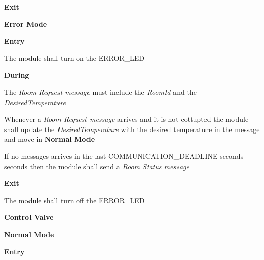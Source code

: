 \begin{req_enum}
\begin{req_enum}[label*=\arabic*.]
\begin{req_enum}[label*=\arabic*.]
							\item \textbf{Exit}
						\end{req_enum}

					\item \textbf{Error Mode}
						\begin{req_enum}[label*=\arabic*.]
							\item \textbf{Entry}
								\begin{req_enum}[label*=\arabic*.]
									\item The module shall turn on the ERROR\_LED
								\end{req_enum}

							\item \textbf{During}
							\begin{req_enum}[label*=\arabic*.]
								\item The \textit{Room Request message} must include the \textit{RoomId} and the \textit{DesiredTemperature}
								\item Whenever a \textit{Room Request message} arrives and it is not cottupted the module shall update the \textit{DesiredTemperature} with the desired temperature in the message and move in \textbf{Normal Mode}
								\item If no messages arrives in the last COMMUNICATION\_DEADLINE seconds  seconds then the module shall send a \textit{Room Status message}
							\end{req_enum}

							\item \textbf{Exit}
								\begin{req_enum}[label*=\arabic*.]
									\item The module shall turn off the ERROR\_LED
								\end{req_enum}
						\end{req_enum}
				\end{req_enum}
			\item \textbf{Control Valve}
				\begin{req_enum}[label*=\arabic*.]
					\item \textbf{Normal Mode}
						\begin{req_enum}[label*=\arabic*.]
							\item \textbf{Entry}


\end{req_enum}
\end{req_enum}
\end{req_enum}
